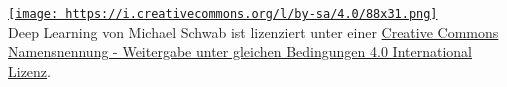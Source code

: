 \href{http://creativecommons.org/licenses/by-sa/4.0/}{\texttt{[image: https://i.creativecommons.org/l/by-sa/4.0/88x31.png]}}\\
{Deep Learning} von {Michael Schwab} ist lizenziert unter einer
\href{http://creativecommons.org/licenses/by-sa/4.0/}{Creative Commons
Namensnennung - Weitergabe unter gleichen Bedingungen 4.0 International
Lizenz}.

